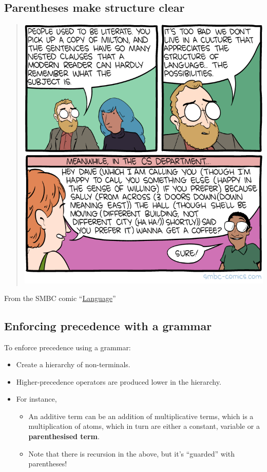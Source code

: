 \documentclass[11pt]{article}
\theoremstyle{definition}
\begin{document}
\subsection{Parentheses make structure clear}
\label{sec:orgfacd5ca}

\begin{quote}
\begin{center}
\includegraphics[width=\textwidth]{./media/comics/language.png}
\end{center}
\end{quote}
From the SMBC comic “\href{http://smbc-comics.com/comic/language}{Language}”

\subsection{Enforcing precedence with a grammar}
\label{sec:orgd04cbac}
To enforce precedence using a grammar:
\begin{itemize}
\item Create a hierarchy of non-terminals.
\item Higher-precedence operators are produced lower in the hierarchy.
\item For instance,
\begin{itemize}
\item An additive term can be an addition of multiplicative terms,
which is a multiplication of atoms, which in turn are
either a constant, variable or a \textbf{parenthesised term}.
\item Note that there is recursion in the above,
but it's “guarded” with parentheses!
\end{itemize}
\end{itemize}
\end{document}
